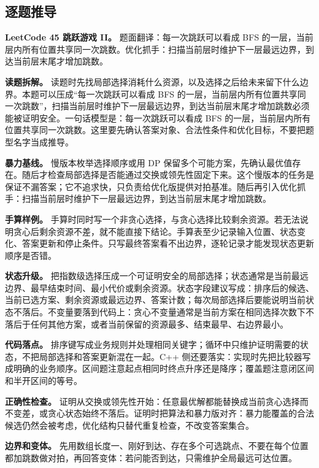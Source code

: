 \subsection{逐题推导}

\noindent\textbf{LeetCode 45 跳跃游戏 II。} 题面翻译：每一次跳跃可以看成 BFS 的一层，当前层内所有位置共享同一次跳数。优化抓手：扫描当前层时维护下一层最远边界，到达当前层末尾才增加跳数。

\textbf{读题拆解。} 读题时先找局部选择消耗什么资源，以及选择之后给未来留下什么边界。本题可以压成“每一次跳跃可以看成 BFS 的一层，当前层内所有位置共享同一次跳数”，扫描当前层时维护下一层最远边界，到达当前层末尾才增加跳数必须能被证明安全。一句话模型是：每一次跳跃可以看成 BFS 的一层，当前层内所有位置共享同一次跳数。这里要先确认答案对象、合法性条件和优化目标，不要把题型名字当成推导。

\textbf{暴力基线。} 慢版本枚举选择顺序或用 DP 保留多个可能方案，先确认最优值存在。随后才检查局部选择是否能通过交换或领先性固定下来。这个慢版本的任务是保证不漏答案；它不追求快，只负责给优化版提供对拍基准。随后再引入优化抓手：扫描当前层时维护下一层最远边界，到达当前层末尾才增加跳数。

\textbf{手算样例。} 手算时同时写一个非贪心选择，与贪心选择比较剩余资源。若无法说明贪心后剩余资源不差，就不能直接下结论。手算表至少记录输入位置、状态变化、答案更新和停止条件。只写最终答案看不出边界，逐轮记录才能发现状态更新顺序是否错。

\textbf{状态升级。} 把指数级选择压成一个可证明安全的局部选择；状态通常是当前最远边界、最早结束时间、最小代价或剩余资源。状态字段建议写成：排序后的候选、当前已选方案、剩余资源或最远边界、答案计数；每次局部选择后要能说明当前状态不落后。不变量要落到代码上：贪心不变量通常是当前方案在相同选择次数下不落后于任何其他方案，或者当前保留的资源最多、结束最早、右边界最小。

\textbf{代码落点。} 排序键写成业务规则并处理相同关键字；循环中只维护证明需要的状态，不把局部选择和答案更新混在一起。C++ 侧还要落实：实现时先把比较器写成明确的业务顺序。区间题注意起点相同时终点升序还是降序；覆盖题注意闭区间和半开区间的等号。

\textbf{正确性检查。} 证明从交换或领先性开始：任意最优解都能替换成当前贪心选择而不变差，或贪心状态始终不落后。证明时把算法和暴力版对齐：暴力能覆盖的合法候选仍然会被考虑，优化结构只替代重复检查，不改变答案集合。

\textbf{边界和变体。} 先用数组长度一、刚好到达、存在多个可选跳点、不要在每个位置都加跳数做对拍，再回答变体：若问能否到达，只需维护全局最远可达位置。

